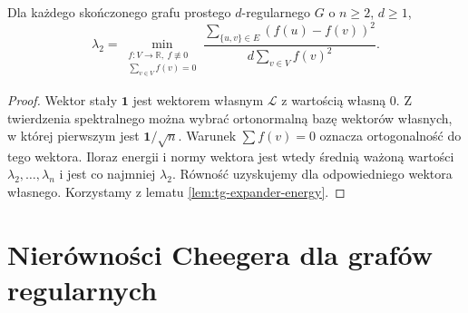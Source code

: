 \begin{stwierdzenie}
\label{prop:tg-expander-rayleigh}
Dla każdego skończonego grafu prostego
$d$-regularnego $G$ o $n\geq2$, $d\geq1$,
\[
\lambda_2=
\min_{\substack{f:V\to\mathbb R,\ f\not\equiv0\\
                 \sum_{v\in V}f(v)=0}}
\frac{\sum_{\{u,v\}\in E}(f(u)-f(v))^2}
{d\sum_{v\in V}f(v)^2}.
\]
\end{stwierdzenie}
\begin{proof}
Wektor stały $\boldsymbol1$ jest
wektorem własnym $\mathcal L$
z wartością własną $0$.
Z twierdzenia spektralnego
można wybrać ortonormalną
bazę wektorów własnych,
w której pierwszym jest
$\boldsymbol1/\sqrt n$.
Warunek $\sum f(v)=0$
oznacza ortogonalność do
tego wektora. Iloraz energii
i normy wektora jest wtedy
średnią ważoną wartości
$\lambda_2,\ldots,\lambda_n$
i jest co najmniej $\lambda_2$.
Równość uzyskujemy dla
odpowiedniego wektora własnego.
Korzystamy z lematu
\ref{lem:tg-expander-energy}.
\end{proof}

\section{Nierówności Cheegera dla grafów regularnych}
\label{sec:tg-expanders-cheeger}

